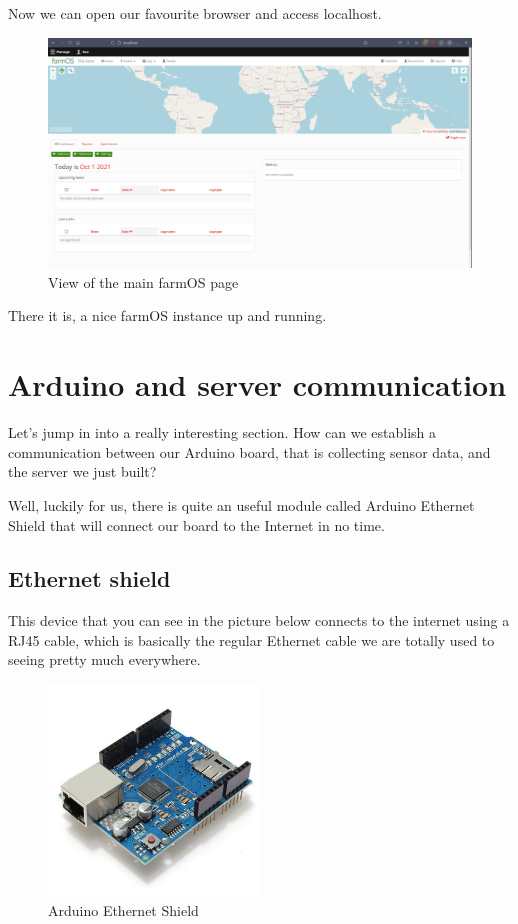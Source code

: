 Now we can open our favourite browser and access localhost.

\begin{figure}[H]
    \centering
    \includegraphics[width=1\textwidth]{fig/drupal-install/farmos-main-page.png}
    \caption{View of the main farmOS page}
    \label{fig:farmos-main-page}
\end{figure}

There it is, a nice farmOS instance up and running.



\section{Arduino and server communication}
Let's jump in into a really interesting section. How can we establish a communication between our Arduino board, that is collecting sensor data, and the server we just built?

Well, luckily for us, there is quite an useful module called Arduino Ethernet Shield that will connect our board to the Internet in no time.

\subsection{Ethernet shield}
This device that you can see in the picture below connects to the internet using a RJ45 cable, which is basically the regular Ethernet cable we are totally used to seeing pretty much everywhere.

\begin{figure}[H]
    \centering
    \includegraphics[width=0.5\textwidth]{fig/ethernet.jpg}
    \caption{Arduino Ethernet Shield}
    \label{fig:ethernet}
\end{figure}

